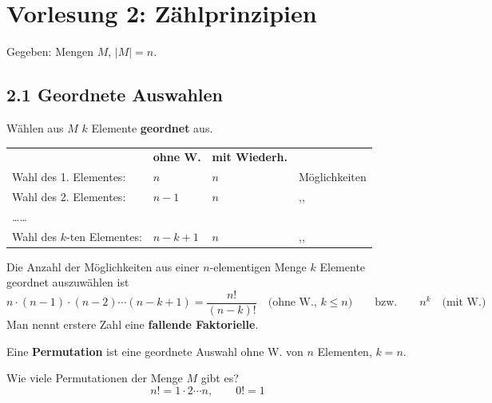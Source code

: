 
\section{Vorlesung 2: Zählprinzipien}
Gegeben: Mengen $M$, \quad $|M| = n$.

\subsection{2.1 Geordnete Auswahlen}

Wählen aus $M$ $k$ Elemente \textbf{geordnet} aus.

\begin{center}
\begin{tabular}{llll}
 & \textbf{ohne W.} & \textbf{mit Wiederh.} & \\
Wahl des 1. Elementes: & $n$ & $n$ & Möglichkeiten \\
Wahl des 2. Elementes: & $n-1$ & $n$ & ,,\\
\quad \dots \quad \dots & & & \\
Wahl des $k$-ten Elementes: & $n-k+1$ & $n$ & ,,\\
\end{tabular}
\end{center}

\begin{satz}
Die Anzahl der Möglichkeiten aus einer $n$-elementigen Menge $k$ Elemente geordnet auszuwählen ist
\[
n \cdot (n-1) \cdot (n-2) \cdots (n-k+1) = \frac{n!}{(n-k)!} \quad \text{(ohne W., } k \le n\text{)} \qquad \text{bzw.} \qquad n^k \quad \text{(mit W.)}
\]
Man nennt erstere Zahl eine \textbf{fallende Faktorielle}.
\end{satz}

\begin{bemerkung}
Eine \textbf{Permutation} ist eine geordnete Auswahl ohne W. von $n$ Elementen, $k = n$.

Wie viele Permutationen der Menge $M$ gibt es?
\[
n! = 1 \cdot 2 \cdots n, \qquad 0! = 1
\]
\end{bemerkung}

